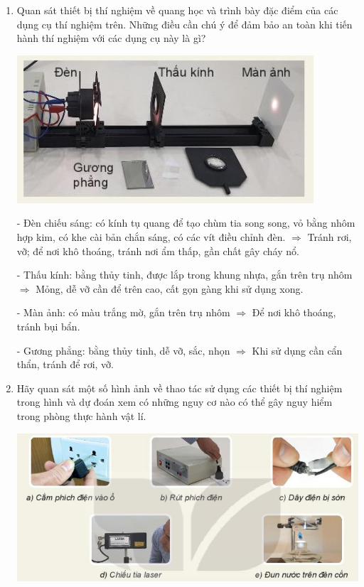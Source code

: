 \begin{enumerate}[label=\bfseries Câu \arabic*:]
{		+ Không trực tiếp thổi tắt ngọn lửa đèn cồn vì sẽ làm ngọn lửa cháy dữ dội hơn. Cách tốt nhất để tắt đèn là đậy nắp đèn cồn lại.
		
	}
	\item {}
	
	
	{
		Quan sát thiết bị thí nghiệm về quang học và trình bày đặc điểm của các dụng cụ thí nghiệm trên. Những điều cần chú ý để đảm bảo an toàn khi tiến hành thí nghiệm với các dụng cụ này là gì?
		
		\begin{center}
			\includegraphics[scale=0.6]{../figs/VN10-2022-PH-TP003-4.jpg}
		\end{center}
	}
	
	\hideall
	{	
		- Đèn chiếu sáng: có kính tụ quang để tạo chùm tia song song, vỏ bằng nhôm hợp kim, có khe cài bản chắn sáng, có các vít điều chỉnh đèn. $\Rightarrow$ Tránh rơi, vỡ; để nơi khô thoáng, tránh nơi ẩm thấp, gần chất gây cháy nổ.
		
		- Thấu kính: bằng thủy tinh, được lắp trong khung nhựa, gắn trên trụ nhôm $\Rightarrow$ Mỏng, dễ vỡ cần để trên cao, cất gọn gàng khi sử dụng xong.
		
		- Màn ảnh: có màu trắng mờ, gắn trên trụ nhôm $\Rightarrow$ Để nơi khô thoáng, tránh bụi bẩn.
		
		- Gương phẳng: bằng thủy tinh, dễ vỡ, sắc, nhọn $\Rightarrow$ Khi sử dụng cần cẩn thẩn, tránh để rơi, vỡ.
		
	}
	\item {}
	
	
	{
		Hãy quan sát một số hình ảnh về thao tác sử dụng các thiết bị thí nghiệm trong hình và dự đoán xem có những nguy cơ nào có thể gây nguy hiểm trong phòng thực hành vật lí.
		
		\begin{center}
			\includegraphics[scale=0.6]{../figs/VN10-2022-PH-TP003-5.jpg}
		\end{center}
	}
	

\end{enumerate}
